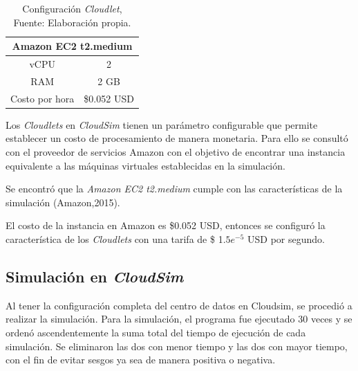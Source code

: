 \documentclass[jou,apacite]{apa6}
\begin{document}
\setcounter{table}{4}
\renewcommand\thetable{\arabic{table}}
\begin{table}[h!]
	\centering
	\begin{tabular}{@{}cc@{}}
		\toprule
		\multicolumn{2}{c}{{\bf Amazon EC2 t2.medium}} \\ \midrule
		vCPU     & 2     \\
		RAM &2 GB \\
		Costo por hora           & \$0.052 USD      \\ \midrule
		
	\end{tabular}
	\caption{Configuraci\'on \textit{Cloudlet}, Fuente: Elaboraci\'on propia.}
	\label{tab:cloudlet}
\end{table}

Los \textit{Cloudlets} en \textit{CloudSim} tienen un parámetro configurable que permite establecer un costo de procesamiento de manera monetaria. Para ello se consultó con el proveedor de servicios Amazon con el objetivo de  encontrar una instancia equivalente a las máquinas virtuales establecidas en la simulación. 

Se encontró que la \textit{Amazon EC2 t2.medium} cumple con las características de la simulación (Amazon,2015).

El costo de la instancia en Amazon es \$0.052 USD, entonces se configuró la característica  de los \textit{Cloudlets} con una tarifa de \$ 1.$5 e^{-5}$ USD por segundo.

\subsection{Simulación en \textit{CloudSim}}

Al tener la configuración completa del centro de datos en Cloudsim, se procedió a realizar la simulación.
Para la simulación, el programa fue ejecutado 30 veces y se ordenó ascendentemente la suma total del tiempo de ejecución de cada simulación. Se eliminaron las dos con menor tiempo y las dos con mayor tiempo, con el fin de evitar sesgos ya sea de manera positiva o negativa.
\end{document}
